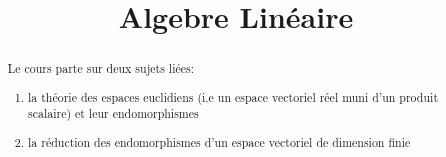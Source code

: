 \documentclass[a4paper]{report}
\title{Algebre Linéaire}
\begin{document}
\maketitle
\begin{abstract}
    Le cours parte sur deux sujets liées:
    \begin{enumerate}
        \item la théorie des espaces euclidiens (i.e un espace vectoriel réel muni d'un produit scalaire) et leur endomorphismes
        \item la réduction des endomorphismes d'un espace vectoriel de dimension finie
    \end{enumerate}
\end{abstract}

\end{document}
